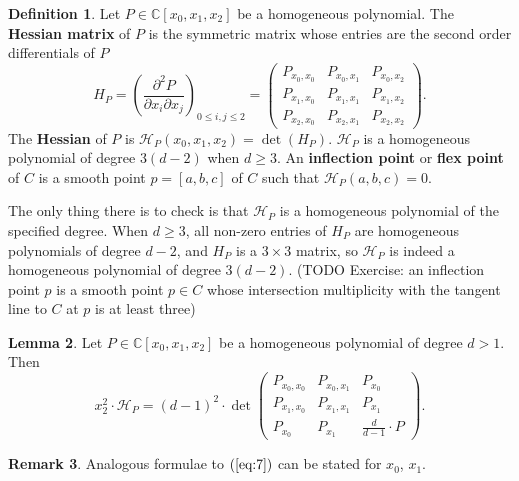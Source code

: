 \documentclass{article}
\newcommand{\C}{\mathbb{C}}
\newcommand{\rb}[1]{\left( #1 \right)}
\renewcommand{\sb}[1]{\left[ #1 \right]}
\theoremstyle{definition}\newtheorem{definition}{Definition}[section]
\theoremstyle{definition}\newtheorem{notation}[definition]{Notation}
\theoremstyle{definition}\newtheorem{remark}[definition]{Remark}
\theoremstyle{definition}\newtheorem{example}[definition]{Example}
\theoremstyle{definition}\newtheorem{fact}{Fact}
\theoremstyle{definition}\newtheorem{exercise}{Exercise}
\newtheorem{lemma}[definition]{Lemma}
\begin{document}
\begin{definition}
\label{def:13.2}
Let $ P \in \C\sb{x_0, x_1, x_2} $ be a homogeneous polynomial. The \textbf{Hessian matrix} of $ P $ is the symmetric matrix whose entries are the second order differentials of $ P $
$$ H_P = \rb{\dfrac{\partial^2 P}{\partial x_i \partial x_j}}_{0 \le i, j \le 2} = \begin{pmatrix} P_{x_0, x_0} & P_{x_0, x_1} & P_{x_0, x_2} \\ P_{x_1, x_0} & P_{x_1, x_1} & P_{x_1, x_2} \\ P_{x_2, x_0} & P_{x_2, x_1} & P_{x_2, x_2} \end{pmatrix}. $$
The \textbf{Hessian} of $ P $ is $ \mathcal{H}_P\rb{x_0, x_1, x_2} = \det\rb{H_P} $. $ \mathcal{H}_P $ is a homogeneous polynomial of degree $ 3\rb{d - 2} $ when $ d \ge 3 $. An \textbf{inflection point} or \textbf{flex point} of $ C $ is a smooth point $ p = \sb{a, b, c} $ of $ C $ such that $ \mathcal{H}_P\rb{a, b, c} = 0 $.
\end{definition}

The only thing there is to check is that $ \mathcal{H}_P $ is a homogeneous polynomial of the specified degree. When $ d \ge 3 $, all non-zero entries of $ H_P $ are homogeneous polynomials of degree $ d - 2 $, and $ H_P $ is a $ 3 \times 3 $ matrix, so $ \mathcal{H}_P $ is indeed a homogeneous polynomial of degree $ 3\rb{d - 2} $. (TODO Exercise: an inflection point $ p $ is a smooth point $ p \in C $ whose intersection multiplicity with the tangent line to $ C $ at $ p $ is at least three)

\begin{lemma}
\label{lem:13.3}
Let $ P \in \C\sb{x_0, x_1, x_2} $ be a homogeneous polynomial of degree $ d > 1 $. Then
\begin{equation}
\label{eq:7}
x_2^2 \cdot \mathcal{H}_P = \rb{d - 1}^2 \cdot \det\begin{pmatrix} P_{x_0, x_0} & P_{x_0, x_1} & P_{x_0} \\ P_{x_1, x_0} & P_{x_1, x_1} & P_{x_1} \\ P_{x_0} & P_{x_1} & \tfrac{d}{d - 1} \cdot P \end{pmatrix}.
\end{equation}
\end{lemma}

\begin{remark}
Analogous formulae to $ \rb{\ref{eq:7}} $ can be stated for $ x_0 $, $ x_1 $.
\end{remark}
\end{document}
